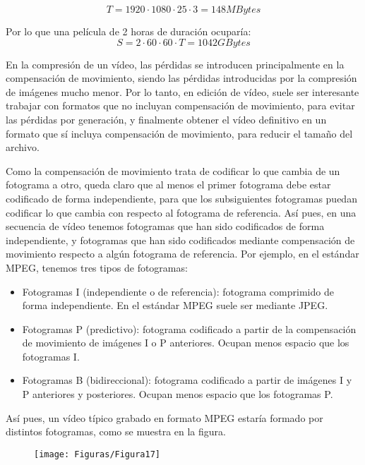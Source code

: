 \documentclass[es,practica]{uah}
\begin{document}
\begin{displaymath}
	T=1920\cdot 1080\cdot 25\cdot 3=148MBytes
\end{displaymath}

Por lo que una película de 2 horas de duración ocuparía:
\begin{displaymath}
	S=2\cdot 60\cdot 60\cdot T=1042GBytes
\end{displaymath}

En la compresión de un vídeo, las pérdidas se introducen principalmente en la compensación de movimiento, siendo las pérdidas introducidas por la compresión de imágenes mucho menor. Por lo tanto, en edición de vídeo, suele ser interesante trabajar con formatos que no incluyan compensación de movimiento, para evitar las pérdidas por generación, y finalmente obtener el vídeo definitivo en un formato que sí incluya compensación de movimiento, para reducir el tamaño del archivo.

Como la compensación de movimiento trata de codificar lo que cambia de un fotograma a otro, queda claro que al menos el primer fotograma debe estar codificado de forma independiente, para que los subsiguientes fotogramas puedan codificar lo que cambia con respecto al fotograma de referencia. Así pues, en una secuencia de vídeo tenemos fotogramas que han sido codificados de forma independiente, y fotogramas que han sido codificados mediante compensación de movimiento respecto a algún fotograma de referencia. Por ejemplo, en el estándar MPEG, tenemos tres tipos de fotogramas:
\begin{itemize}
	\item Fotogramas I (independiente o de referencia): fotograma comprimido de forma independiente. En el estándar MPEG suele ser mediante JPEG.
	\item Fotogramas P (predictivo): fotograma codificado a partir de la compensación de movimiento de imágenes I o P anteriores. Ocupan menos espacio que los fotogramas I.
	\item Fotogramas B (bidireccional): fotograma codificado a partir de imágenes I y P anteriores y posteriores. Ocupan menos espacio que los fotogramas P.
\end{itemize}


Así pues, un vídeo típico grabado en formato MPEG estaría formado por distintos fotogramas, como se muestra en la figura.

\begin{figure}[h!]
  \centering
  \texttt{[image: Figuras/Figura17]}
\end{figure}
\end{document}
